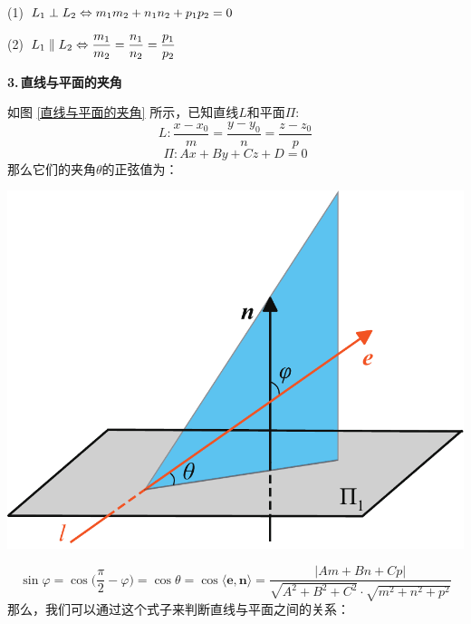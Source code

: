 \noindent
\begin{minipage}{0.6\linewidth}
\hspace*{2em}(1)$\hspace*{0.5em} L_1\perp L_2 \Leftrightarrow  m_1m_2+n_1n_2+p_1p_2=0$
\vspace*{0.5em}

\hspace*{2em}(2)$\hspace*{0.5em} L_1\parallel L_2 \Leftrightarrow \displaystyle \frac{m_1}{m_2}=\frac{n_1}{n_2}=\frac{p_1}{p_2} $
\vspace*{1em}

\textbf{3.$\,$直线与平面的夹角}

\hspace*{2em}如图 \ref{直线与平面的夹角} 所示，已知直线$L$和平面$\Pi$:
\begin{equation}
	\nonumber
	L:\frac{x-x_0}{m}=\frac{y-y_0}{n}=\frac{z-z_0}{p}
\end{equation}
\begin{equation}
	\nonumber
	\Pi:Ax+By+Cz+D=0
\end{equation}
那么它们的夹角$\theta$的正弦值为：
\end{minipage}
\begin{minipage}{0.4\linewidth}
	\centering
	\includegraphics[width = 0.8\linewidth]{pic/C-5/planelineang}
	\vspace*{-1em}
	\label{直线与平面的夹角}
\end{minipage}

\begin{equation}
	\sin \varphi =\cos\bigg( \frac{\pi}{2}-\varphi\bigg)=\cos \theta=\cos \langle \boldsymbol{e},\boldsymbol{n}\rangle =\frac{|Am+Bn+Cp|}{\sqrt{A^2+B^2+C^2}\cdot\sqrt{m^2+n^2+p^2}}
\end{equation}
那么，我们可以通过这个式子来判断直线与平面之间的关系：

